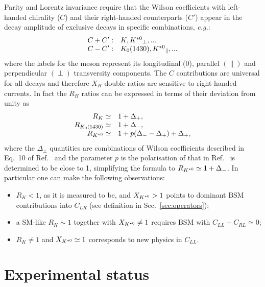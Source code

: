 Parity and Lorentz invariance require that the Wilson coefficients with left-handed chirality ($C$)
and their right-handed counterparts ($C'$) appear in the decay amplitude of exclusive decays in
specific combinations, \emph{e.g.}:
\begin{equation}
\begin{array}{ll}
C+C': & K, {{K}^{*0}}_{\perp}, ...  \\
C-C': & K_0(1430), {{K}^{*0}}_\parallel, ...
\end{array}
\end{equation}
where the labels for the \Kstarz meson represent its longitudinal (0), parallel $(\parallel)$ and
perpendicular $(\perp)$ transversity components. The $C$ contributions are universal for
all decays and therefore $X_H$ double ratios are sensitive to right-handed currents.
In fact the $R_H$ ratios can be expressed in terms of their deviation from unity as
\begin{equation}
\begin{array}{rl}
R_K \simeq 			& 1+ \Delta_+, 		\\
R_{K_0(1430)} \simeq 	& 1+ \Delta_-,		\\
R_{{{K}^{*0}}} \simeq 		& 1+ p(\Delta_- - \Delta_+) + \Delta_+,
\end{array}
\end{equation}
where the $\Delta_\pm$ quantities are combinations of Wilson coefficients
described in Eq.~10 of Ref.~\cite{Hiller:2014ula} and the parameter $p$ is the polarisation of \Kstarz
that in Ref.~\cite{Hiller:2014ula} is determined to be close to 1, simplifying the formula to $R_{{{K}^{*0}}} \simeq 1+ \Delta_-$.
In particular one can make the following observations: 
\begin{itemize}
\item $R_K < 1$, as it is measured to be, and $X_{{{K}^{*0}}} > 1$ points to dominant BSM contributions into $C_{LR}$ (see definition in Sec.~\ref{sec:operators});
\item a SM-like $R_K \sim 1$ together with $X_{{{K}^{*0}}} \neq 1$ requires BSM with $C_{LL} + C_{RL} \simeq 0$;
\item $R_K \neq 1$ and $X_{{{K}^{*0}}} \simeq 1$ corresponds to new physics in $C_{LL}$.
\end{itemize}

\section{Experimental status}

